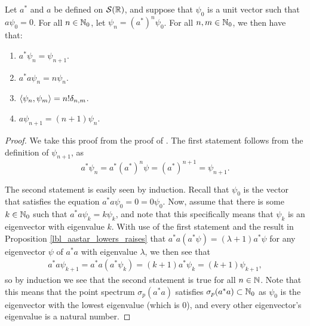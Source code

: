 \begin{theorem}\label{lbl_oscillator_chains}
  Let $a^*$ and $a$ be defined on $\mathcal{S}(\mathbb{R})$, and suppose that $\psi_0$ is a unit vector such that $a\psi_0 = 0$. For all $n \in \mathbb{N}_0$, let $\psi_n = (a^*)^n \psi_0$. For all $n,m \in \mathbb{N}_0$, we then have that:
  \begin{enumerate}[label=(\alph*)]
    \item $a^*\psi_n = \psi_{n+1}$.
    \item $a^* a \psi_n = n \psi_n$.
    \item $\left\langle \psi_n, \psi_m\right\rangle = n!\delta_{n,m}$.
    \item $a\psi_{n + 1} = (n+1)\psi_n$.
  \end{enumerate}
\end{theorem}
\begin{proof}
  We take this proof from the proof of {\cite[Theorem 11.2]{Hall2013}}. The first statement follows from the definition of $\psi_{n+1}$, as \[a^*\psi_n = a^* (a^*)^n \psi = (a^*)^{n+1} = \psi_{n+1}.\]

  The second statement is easily seen by induction. Recall that $\psi_0$ is the vector that satisfies the equation $a^* a \psi_0 = 0 = 0 \psi_0$. Now, assume that there is some $k \in \mathbb{N}_0$ such that $a^* a \psi_k = k \psi_k$, and note that this specifically means that $\psi_k$ is an eigenvector with eigenvalue $k$. With use of the first statement and the result in Proposition \eqref{lbl_aastar_lowers_raises} that $a^* a (a^* \psi) = (\lambda + 1) a^* \psi$ for any eigenvector $\psi$ of $a^*a$ with eigenvalue $\lambda$, we then see that
  \begin{align*}
      a^*a \psi_{k+1}
      =
      a^* a (a^* \psi_{k})
      =
      (k+1)a^* \psi_k
      =
      (k+1)\psi_{k+1},
  \end{align*}
  so by induction we see that the second statement is true for all $n \in \mathbb{N}$. Note that this means that the point spectrum $\sigma_p(a^*a)$ satisfies $\sigma_p(a^*a) \subset \mathbb{N}_0$ as $\psi_0$ is the eigenvector with the lowest eigenvalue (which is 0), and every other eigenvector's eigenvalue is a natural number.

  \medskip


\end{proof}
